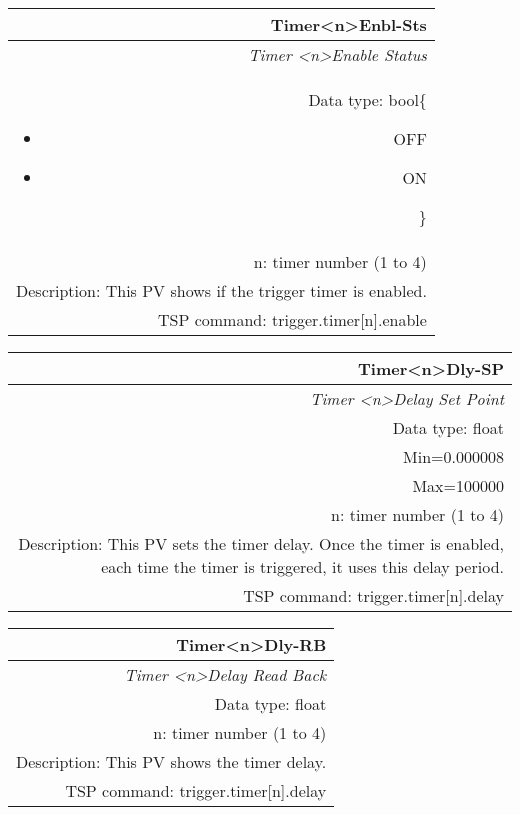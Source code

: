 \documentclass[openany]{article}
\begin{document}
		\begin{tabular}{N}
			\hline
			\bfseries Timer{\textless n\textgreater}Enbl-Sts\label{pv:timerenbl-sts} \\ \hline
			\emph{Timer \textless n\textgreater Enable Status} \\
			Data type: bool\{\begin{itemize}[noitemsep]
				\small
				\item[] OFF
				\item[] ON
			\end{itemize}\} \\
			n: timer number (1 to 4) \\
			Description: This PV shows if the trigger timer is enabled. \\
			TSP command: trigger.timer[n].enable
		\end{tabular}

		\begin{tabular}{N}
			\hline
			\bfseries Timer{\textless n\textgreater}Dly-SP\label{pv:timerdly-sp} \\ \hline
			\emph{Timer \textless n\textgreater Delay Set Point} \\
			Data type: float \\
			Min=0.000008 \\
			Max=100000 \\
			n: timer number (1 to 4) \\
			Description: This PV sets the timer delay. Once the timer is enabled, each time the timer is triggered, it uses this delay period. \\
			TSP command: trigger.timer[n].delay
		\end{tabular}

		\begin{tabular}{N}
			\hline
			\bfseries Timer{\textless n\textgreater}Dly-RB\label{pv:timerdly-rb} \\ \hline
			\emph{Timer \textless n\textgreater Delay Read Back} \\
			Data type: float \\
			n: timer number (1 to 4) \\
			Description: This PV shows the timer delay. \\
			TSP command: trigger.timer[n].delay
		\end{tabular}
\end{document}
